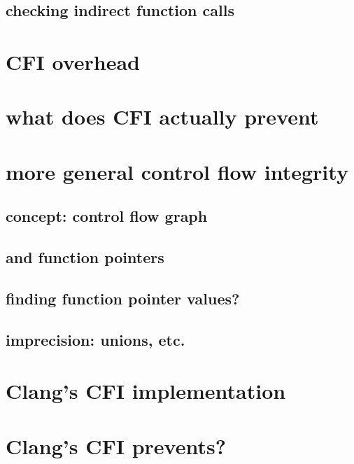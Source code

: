 \subsection{checking indirect function calls}



\section{CFI overhead}


\section{what does CFI actually prevent}

\section{more general control flow integrity}

\subsection{concept: control flow graph}

\subsection{and function pointers}


\subsection{finding function pointer values?}



\subsection{imprecision: unions, etc.}


\section{Clang's CFI implementation}


\section{Clang's CFI prevents?}


